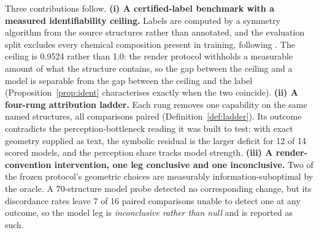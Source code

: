 Three contributions follow.
\textbf{(i) A certified-label benchmark with a measured identifiability ceiling.} Labels are computed by a
symmetry algorithm from the source structures rather than annotated, and the evaluation split excludes
every chemical composition present in training, following \citet{xcrys2506}. The ceiling is 0.9524 rather
than 1.0: the render protocol withholds a measurable amount of what the structure contains, so the gap
between the ceiling and a model is separable from the gap between the ceiling and the label
(Proposition~\ref{prop:ident} characterises exactly when the two coincide).
\textbf{(ii) A four-rung attribution ladder.} Each rung removes one capability on the same named
structures, all comparisons paired (Definition~\ref{def:ladder}). Its outcome contradicts the
perception-bottleneck reading it was built to test: with exact geometry supplied as text, the symbolic
residual is the larger deficit for 12 of 14 scored models, and the perception share tracks model strength.
\textbf{(iii) A render-convention intervention, one leg conclusive and one inconclusive.} Two of the frozen
protocol's geometric choices are measurably information-suboptimal by the oracle. A 70-structure model
probe detected no corresponding change, but its discordance rates leave 7 of 16 paired comparisons unable
to detect one at any outcome, so the model leg is \emph{inconclusive rather than null} and is reported as
such.
